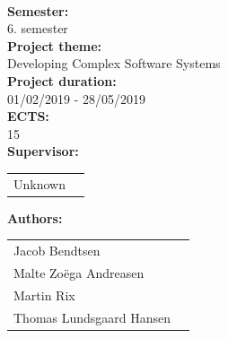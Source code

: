 \newpage
\makeatother
\begin{minipage}[T]{0.45\textwidth}
 \begin{flushleft}
  \textbf{\normalsize{}}\\ \maketitle
  \textbf{\normalsize{Semester:}}\\6. semester\\
  \textbf{\normalsize{Project theme:}}\\Developing Complex Software Systems\\
  \textbf{\normalsize{Project duration:}}\\01/02/2019 - 28/05/2019\\
  \textbf{\normalsize{ECTS:}}\\15\\
  \textbf{\normalsize{Supervisor:}}\\
  \begin{tabular}{ll}
    \normalsize{Unknown}\\
  \end{tabular}

  \textbf{\normalsize{Authors:}}\\
  \begin{tabular}{ll}
   \normalsize{Jacob Bendtsen}\\
   \normalsize{Malte Zoëga Andreasen}\\
   \normalsize{Martin Rix}\\
   \normalsize{Thomas Lundsgaard Hansen}\\
  \end{tabular}
 \end{flushleft}
\end{minipage}
 ~
